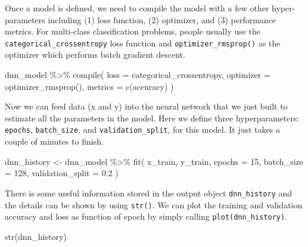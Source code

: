 \documentclass[
  12pt,
]{krantz}
\makeatletter
\newenvironment{Shaded}{\begin{snugshade}}{\end{snugshade}}
\newcommand{\AttributeTok}[1]{\textcolor[rgb]{0.61,0.61,0.61}{#1}}
\newcommand{\DecValTok}[1]{\textcolor[rgb]{0.06,0.06,0.06}{#1}}
\newcommand{\FloatTok}[1]{\textcolor[rgb]{0.06,0.06,0.06}{#1}}
\newcommand{\FunctionTok}[1]{\textcolor[rgb]{0,0,0}{#1}}
\newcommand{\NormalTok}[1]{#1}
\newcommand{\OtherTok}[1]{\textcolor[rgb]{0.37,0.37,0.37}{#1}}
\newcommand{\SpecialCharTok}[1]{\textcolor[rgb]{0,0,0}{#1}}
\newcommand{\StringTok}[1]{\textcolor[rgb]{0.5,0.5,0.5}{#1}}
\newenvironment{kframe}{%
\medskip{}
\setlength{\fboxsep}{.8em}
 \def\at@end@of@kframe{}%
 \ifinner\ifhmode%
  \def\at@end@of@kframe{\end{minipage}}%
  \begin{minipage}{\columnwidth}%
 \fi\fi%
 \def\FrameCommand##1{\hskip\@totalleftmargin \hskip-\fboxsep
 \colorbox{shadecolor}{##1}\hskip-\fboxsep
     \hskip-\linewidth \hskip-\@totalleftmargin \hskip\columnwidth}%
 \MakeFramed {\advance\hsize-\width
   \@totalleftmargin\z@ \linewidth\hsize
   \@setminipage}}%
 {\par\unskip\endMakeFramed%
 \at@end@of@kframe}
\renewenvironment{Shaded}{\begin{kframe}}{\end{kframe}}
\makeatother
\begin{document}
Once a model is defined, we need to compile the model with a few other hyper-parameters including (1) loss function, (2) optimizer, and (3) performance metrics. For multi-class classification problems, people usually use the \texttt{categorical\_crossentropy} loss function and \texttt{optimizer\_rmsprop()} as the optimizer which performs batch gradient descent.

\begin{Shaded}
\begin{Highlighting}[]
\NormalTok{dnn\_model }\SpecialCharTok{\%\textgreater{}\%} \FunctionTok{compile}\NormalTok{(}
  \AttributeTok{loss =} \StringTok{\textquotesingle{}categorical\_crossentropy\textquotesingle{}}\NormalTok{,}
  \AttributeTok{optimizer =} \FunctionTok{optimizer\_rmsprop}\NormalTok{(),}
  \AttributeTok{metrics =} \FunctionTok{c}\NormalTok{(}\StringTok{\textquotesingle{}accuracy\textquotesingle{}}\NormalTok{)}
\NormalTok{)}
\end{Highlighting}
\end{Shaded}

Now we can feed data (x and y) into the neural network that we just built to estimate all the parameters in the model. Here we define three hyperparameters: \texttt{epochs}, \texttt{batch\_size}, and \texttt{validation\_split}, for this model. It just takes a couple of minutes to finish.

\begin{Shaded}
\begin{Highlighting}[]
\NormalTok{dnn\_history }\OtherTok{\textless{}{-}}\NormalTok{ dnn\_model }\SpecialCharTok{\%\textgreater{}\%} \FunctionTok{fit}\NormalTok{(}
\NormalTok{  x\_train, y\_train, }
  \AttributeTok{epochs =} \DecValTok{15}\NormalTok{, }\AttributeTok{batch\_size =} \DecValTok{128}\NormalTok{, }
  \AttributeTok{validation\_split =} \FloatTok{0.2}
\NormalTok{)}
\end{Highlighting}
\end{Shaded}

There is some useful information stored in the output object \texttt{dnn\_history} and the details can be shown by using \texttt{str()}. We can plot the training and validation accuracy and loss as function of epoch by simply calling \texttt{plot(dnn\_history)}.

\begin{Shaded}
\begin{Highlighting}[]
\FunctionTok{str}\NormalTok{(dnn\_history)}
\end{Highlighting}
\end{Shaded}
\end{document}
